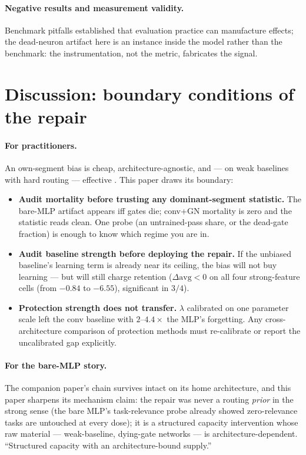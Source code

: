 \documentclass[10pt]{article}
\begin{document}
\paragraph{Negative results and measurement validity.} Benchmark pitfalls
\citep{musgrave2020,lucic2018,melis2018,agarwal2021,lipton2019} established
that evaluation practice can manufacture effects; the dead-neuron artifact
here is an instance inside the model rather than the benchmark: the
instrumentation, not the metric, fabricates the signal.



\section{Discussion: boundary conditions of the repair}
\label{sec:boundary}

\paragraph{For practitioners.} An own-segment bias is cheap,
architecture-agnostic, and --- on weak baselines with hard routing ---
effective . This paper draws its boundary:
\begin{itemize}
\item \textbf{Audit mortality before trusting any dominant-segment
statistic.} The bare-MLP artifact appears iff gates die; conv+GN mortality
is zero and the statistic reads clean. One probe (an untrained-pass
share, or the dead-gate fraction) is enough to know which regime you
are in.
\item \textbf{Audit baseline strength before deploying the repair.}
If the unbiased baseline's learning term is already near its ceiling,
the bias will not buy learning --- but will still charge retention
($\Delta\mathrm{avg}<0$ on all four strong-feature cells (from $-0.84$ to $-6.55$),
significant in $3/4$).
\item \textbf{Protection strength does not transfer.} $\lambda$
calibrated on one parameter scale left the conv baseline with
$2$--$4.4\times$ the MLP's forgetting. Any cross-architecture
comparison of protection methods must re-calibrate or report the
uncalibrated gap explicitly.
\end{itemize}

\paragraph{For the bare-MLP story.} The companion paper's chain survives
intact on its home architecture, and this paper sharpens its
mechanism claim: the repair was never a routing \emph{prior} in the
strong sense (the bare MLP's task-relevance probe already showed
zero-relevance tasks are untouched at every dose); it is a structured capacity
intervention whose raw material --- weak-baseline, dying-gate
networks --- is architecture-dependent. ``Structured capacity with an
architecture-bound supply.''
\end{document}
